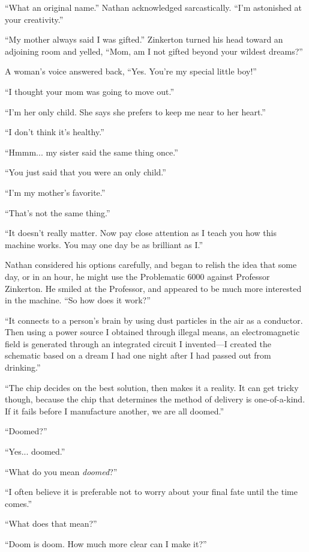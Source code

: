 “What an original name.” Nathan acknowledged sarcastically. “I'm astonished at your creativity.”

“My mother always said I was gifted.” Zinkerton turned his head toward an adjoining room and yelled, “Mom, am I not gifted beyond your wildest dreams?”

A woman's voice answered back, “Yes. You're my special little boy!”

“I thought your mom was going to move out.”

“I'm her only child. She says she prefers to keep me near to her heart.”

“I don't think it's healthy.”

“Hmmm... my sister said the same thing once.”

“You just said that you were an only child.”

“I'm my mother's favorite.”

“That's not the same thing.”

“It doesn't really matter. Now pay close attention as I teach you how this machine works. You may one day be as brilliant as I.”

Nathan considered his options carefully, and began to relish the idea that some day, or in an hour, he might use the Problematic 6000 against Professor Zinkerton. He smiled at the Professor, and appeared to be much more interested in the machine. “So how does it work?”

“It connects to a person's brain by using dust particles in the air as a conductor. Then using a power source I obtained through illegal means, an electromagnetic field is generated through an integrated circuit I invented—I created the schematic based on a dream I had one night after I had passed out from drinking.”

“The chip decides on the best solution, then makes it a reality. It can get tricky though, because the chip that determines the method of delivery is one-of-a-kind. If it fails before I manufacture another, we are all doomed.”

“Doomed?”

“Yes... doomed.”

“What do you mean \textit{doomed}?”

“I often believe it is preferable not to worry about your final fate until the time comes.”

“What does that mean?”

“Doom is doom. How much more clear can I make it?”

